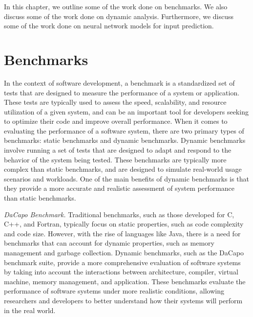 In this chapter, we outline some of the work done on benchmarks.
We also discuss some of the work done on dynamic analysis.
Furthermore, we discuss some of the work done on neural network models for input prediction.

\section{Benchmarks}
In the context of software development, a benchmark is a standardized set of tests that are designed to measure the performance of a system or application.
These tests are typically used to assess the speed, scalability, and resource utilization of a given system, and can be an important tool for developers seeking to optimize their code and improve overall performance.
When it comes to evaluating the performance of a software system, there are two primary types of benchmarks: static benchmarks and dynamic benchmarks.
Dynamic benchmarks involve running a set of tests that are designed to adapt and respond to the behavior of the system being tested. These benchmarks are typically more complex than static benchmarks, and are designed to simulate real-world usage scenarios and workloads.
One of the main benefits of dynamic benchmarks is that they provide a more accurate and realistic assessment of system performance than static benchmarks.

\textit{DaCapo Benchmark.} Traditional benchmarks, such as those developed for C, C++, and Fortran, typically focus on static properties, such as code complexity and code size.
However, with the rise of languages like Java, there is a need for benchmarks that can account for dynamic properties, such as memory management and garbage collection.
Dynamic benchmarks, such as the DaCapo benchmark suite, provide a more comprehensive evaluation of software systems by taking into account the interactions between architecture, compiler, virtual machine, memory management, and application. These benchmarks evaluate the performance of software systems under more realistic conditions, allowing researchers and developers to better understand how their systems will perform in the real world. \cite{DaCapo_2006}

